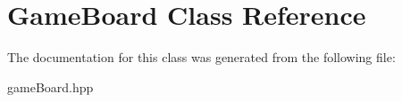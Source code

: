 \hypertarget{classGameBoard}{}\section{Game\+Board Class Reference}
\label{classGameBoard}


The documentation for this class was generated from the following file\+:\begin{DoxyCompactItemize}
\item 
game\+Board.\+hpp\end{DoxyCompactItemize}
